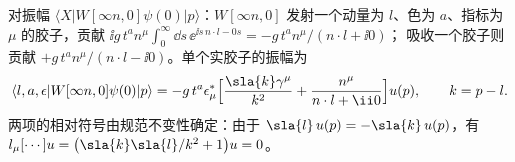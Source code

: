 \begin{remark}\label{rem:cpdf-eikonal}
对振幅 $\langle X|W[\infty n,0]\psi(0)|p\rangle$：$W[\infty n,0]$ 发射一个动量为 $l$、色为 $a$、指标为 $\mu$ 的胶子，贡献
$\ii g\,t^an^\mu\int_0^\infty\dd s\,\ee^{\ii s\,n\cdot l-0s}=-g\,t^an^\mu/(n\cdot l+\ii0)$；
吸收一个胶子则贡献 $+g\,t^an^\mu/(n\cdot l-\ii0)$。单个实胶子的振幅为
\begin{equation}\label{eq:cpdf-amp}
\langle l,a,\epsilon|W[\infty n,0]\psi(0)|p\rangle=-g\,t^a\epsilon^*_\mu\Big[\frac{\sla{k}\gamma^\mu}{k^2}+\frac{n^\mu}{n\cdot l+\ii0}\Big]u(p),\qquad k=p-l .
\end{equation}
两项的相对符号由规范不变性确定：由于 $\sla{l}\,u(p)=-\sla{k}\,u(p)$，有 $l_\mu[\cdots]u=\big(\sla{k}\sla{l}/k^2+1\big)u=0$。
\end{remark}

